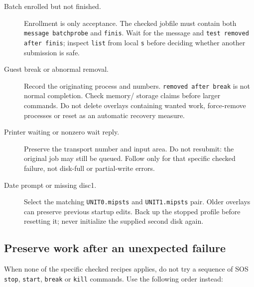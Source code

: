 \begin{description}
\item[Batch enrolled but not finished.] Enrollment is only acceptance. The
checked jobfile must contain both \texttt{message batchprobe} and \texttt{finis}.
Wait for the message and \texttt{test removed after finis}; inspect \texttt{list}
from local \texttt{s} before deciding whether another submission is safe.
\item[Guest break or abnormal removal.] Record the originating process and
numbers. \texttt{removed after break} is not normal completion. Check memory/
storage claims before larger commands. Do not delete overlays containing wanted
work, force-remove processes or reset as an automatic recovery measure.
\item[Printer waiting or nonzero wait reply.] Preserve the transport number and
input area. Do not resubmit: the original job may still be queued. Follow
 only for that
specific checked failure, not disk-full or partial-write errors.
\item[Date prompt or missing disc1.] Select the matching \texttt{UNIT0.mipsts}
and \texttt{UNIT1.mipsts} pair. Older overlays can preserve previous startup
edits. Back up the stopped profile before resetting it; never initialize the
supplied second disk again.
\end{description}

\subsection{Preserve work after an unexpected failure}\label{mips-ts-unexpected-failure}

When none of the specific checked recipes applies, do not try a sequence of
SOS \texttt{stop}, \texttt{start}, \texttt{break} or \texttt{kill} commands.
Use the following order instead:


